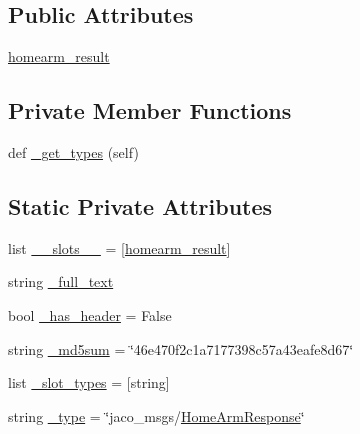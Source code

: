 \subsection*{Public Attributes}
\begin{DoxyCompactItemize}
\item 
\hyperlink{classjaco__msgs_1_1srv_1_1__HomeArm_1_1HomeArmResponse_ab8f752cc7b9a50d887ea43e81ac6da6b}{homearm\+\_\+result}
\end{DoxyCompactItemize}
\subsection*{Private Member Functions}
\begin{DoxyCompactItemize}
\item 
def \hyperlink{classjaco__msgs_1_1srv_1_1__HomeArm_1_1HomeArmResponse_ab2d46d1a32ea7b9108569f4d1f3a23c7}{\+\_\+get\+\_\+types} (self)
\end{DoxyCompactItemize}
\subsection*{Static Private Attributes}
\begin{DoxyCompactItemize}
\item 
list \hyperlink{classjaco__msgs_1_1srv_1_1__HomeArm_1_1HomeArmResponse_a374bd8dbd92ae0c897b99e948962e6ec}{\+\_\+\+\_\+slots\+\_\+\+\_\+} = \mbox{[}\textquotesingle{}\hyperlink{classjaco__msgs_1_1srv_1_1__HomeArm_1_1HomeArmResponse_ab8f752cc7b9a50d887ea43e81ac6da6b}{homearm\+\_\+result}\textquotesingle{}\mbox{]}
\item 
string \hyperlink{classjaco__msgs_1_1srv_1_1__HomeArm_1_1HomeArmResponse_a93833b18a9eb783bf8f1a40ff63af20c}{\+\_\+full\+\_\+text}
\item 
bool \hyperlink{classjaco__msgs_1_1srv_1_1__HomeArm_1_1HomeArmResponse_a6e4db6dcbc837c615c831bd7bb31891d}{\+\_\+has\+\_\+header} = False
\item 
string \hyperlink{classjaco__msgs_1_1srv_1_1__HomeArm_1_1HomeArmResponse_a124d11f535b113cc715378c7f3beec37}{\+\_\+md5sum} = \char`\"{}46e470f2c1a7177398c57a43eafe8d67\char`\"{}
\item 
list \hyperlink{classjaco__msgs_1_1srv_1_1__HomeArm_1_1HomeArmResponse_a72c056989bcde2c2c1ac693a83c58b79}{\+\_\+slot\+\_\+types} = \mbox{[}\textquotesingle{}string\textquotesingle{}\mbox{]}
\item 
string \hyperlink{classjaco__msgs_1_1srv_1_1__HomeArm_1_1HomeArmResponse_a2d7ef964c2b3b55e2a2994c4008e2dbe}{\+\_\+type} = \char`\"{}jaco\+\_\+msgs/\hyperlink{classjaco__msgs_1_1srv_1_1__HomeArm_1_1HomeArmResponse}{Home\+Arm\+Response}\char`\"{}
\end{DoxyCompactItemize}


